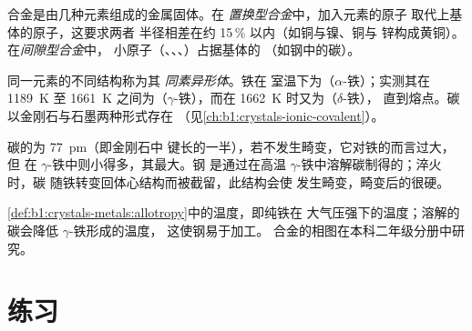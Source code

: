 \begin{definition}[合金]\label{def:b1:crystals-metals:alloy}
合金是由几种元素组成的金属固体。在
\emph{置换型合金}中，加入元素的原子
取代上基体的原子，这要求两者
半径相差在约 15\,\% 以内（如铜与镍、铜与
锌构成黄铜）。在\emph{间隙型合金}中，
小原子（、、、）占据基体的
（如钢中的碳）。
\end{definition}

\begin{definition}[同素异形体]\label{def:b1:crystals-metals:allotropy}
同一元素的不同结构称为其
\emph{同素异形体}。铁在
室温下为（$\alpha$-铁）；实测其在 \qty{1189}{K} 至
\qty{1661}{K} 之间为（$\gamma$-铁），而在 \qty{1662}{K} 时又为（$\delta$-铁），
直到熔点。碳以金刚石与石墨两种形式存在
（见\cref{ch:b1:crystals-ionic-covalent}）。
\end{definition}

\begin{example}[钢]\label{ex:b1:crystals-metals:steel}
碳的为 \qty{77}{pm}（即金刚石中 
键长的一半），若不发生畸变，它对铁的而言过大，但
在 $\gamma$-铁中则小得多，其最大。钢
是通过在高温 $\gamma$-铁中溶解碳制得的；淬火时，碳
随铁转变回体心结构而被截留，此结构会使
发生畸变，畸变后的很硬。
\end{example}

\begin{remark}[铁的相变]\label{rem:b1:crystals-metals:iron-T}
\cref{def:b1:crystals-metals:allotropy}中的温度，即纯铁在
大气压强下的温度；溶解的碳会降低 $\gamma$-铁形成的温度，
这使钢易于加工。
合金的相图在本科二年级分册中研究。
\end{remark}

\section{练习}

